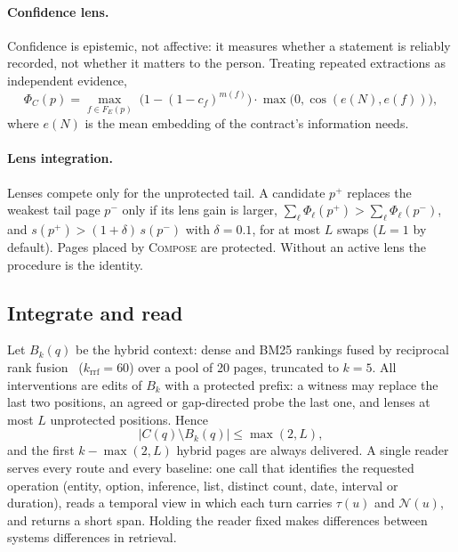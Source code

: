 \paragraph{Confidence lens.}
Confidence is epistemic, not affective: it measures whether a statement is
reliably recorded, not whether it matters to the person. Treating repeated
extractions as independent evidence,
\begin{equation}
  \Phi_C(p)=\max_{f\in F_E(p)}\;\bigl(1-(1-c_f)^{m(f)}\bigr)\cdot
  \max\bigl(0,\cos(e(N),e(f))\bigr),
  \label{eq:confidence}
\end{equation}
where $e(N)$ is the mean embedding of the contract's information needs.

\paragraph{Lens integration.}
Lenses compete only for the unprotected tail. A candidate $p^+$ replaces the
weakest tail page $p^-$ only if its lens gain is larger,
$\sum_\ell\Phi_\ell(p^+)>\sum_\ell\Phi_\ell(p^-)$, and
$s(p^+)>(1+\delta)\,s(p^-)$ with $\delta=0.1$, for at most $L$ swaps
($L=1$ by default). Pages placed by \textsc{Compose} are protected. Without an
active lens the procedure is the identity.

\subsection{Integrate and read}\label{sec:integrate}

Let $B_k(q)$ be the hybrid context: dense and BM25 rankings fused by
reciprocal rank fusion~\cite{cormack2009rrf} ($k_{\text{rrf}}=60$) over a pool
of 20 pages, truncated to $k=5$. All interventions are edits of $B_k$ with a
protected prefix: a witness may replace the last two positions, an agreed or
gap-directed probe the last one, and lenses at most $L$ unprotected positions.
Hence
\begin{equation}
  |C(q)\setminus B_k(q)|\le\max(2,L),
  \label{eq:edits}
\end{equation}
and the first $k-\max(2,L)$ hybrid pages are always delivered. A single
reader serves every route and every baseline: one call that identifies the
requested operation (entity, option, inference, list, distinct count, date,
interval or duration), reads a temporal view in which each turn carries
$\tau(u)$ and $\mathcal{N}(u)$, and returns a short span. Holding the reader
fixed makes differences between systems differences in retrieval.

